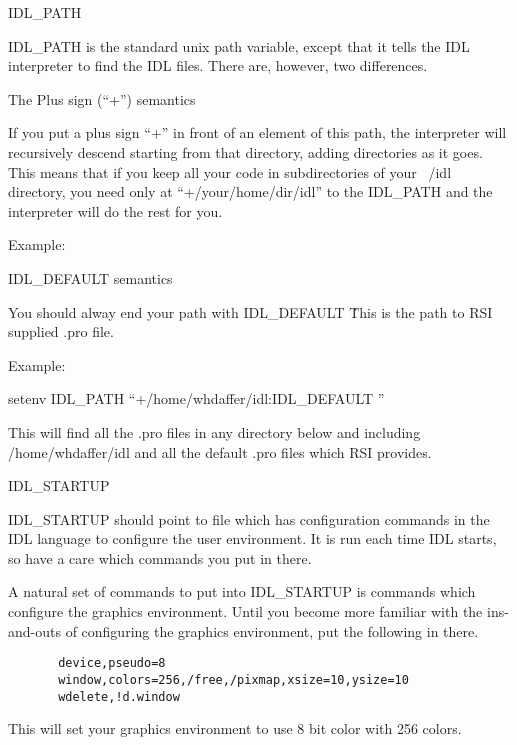 \documentclass{article}
\begin{document}
 
   \bi 
    \item IDL\_PATH

     IDL\_PATH is the standard unix path variable, except that it
     tells the IDL interpreter to find the IDL files. There are,
     however, two differences.
	
     \be 
       \item The Plus sign  (``+'') semantics

         If you put a plus sign ``+'' in front of an element of this
         path, the interpreter will recursively descend starting
         from that directory, adding directories as it goes. This
         means that if you keep all your code in subdirectories of your ~/idl
         directory, you need only at ``+/your/home/dir/idl'' to the
         IDL\_PATH and the interpreter will do the rest for you.

	Example:
	
      \item \LT IDL\_DEFAULT \GT semantics

	You should alway end your path with \LT IDL\_DEFAULT \GT\.
        This is the path to RSI supplied .pro file. 

     \ee

     Example: 

       setenv IDL\_PATH ``+/home/whdaffer/idl:\LT IDL\_DEFAULT \GT''

     This will find all the .pro files in any directory below and
     including /home/whdaffer/idl and all the default .pro files which
     RSI provides.
  
   \item IDL\_STARTUP

     IDL\_STARTUP should point to file which has configuration
     commands in the IDL language to configure the user environment. It
     is run each time IDL starts, so have a care which commands you put
     in there.


     A natural set of commands to put into IDL\_STARTUP is commands
     which configure the graphics environment. Until you become more
     familiar with the ins-and-outs of configuring the graphics
     environment, put the following in there.

    \begin{verbatim}
       device,pseudo=8
       window,colors=256,/free,/pixmap,xsize=10,ysize=10
       wdelete,!d.window
    \end{verbatim}

    This will set your graphics environment to use 8 bit color with
    256 colors.
\end{document}
